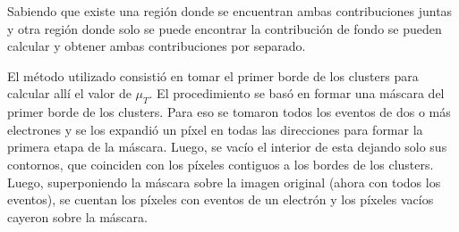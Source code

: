Sabiendo que existe una región donde se encuentran ambas contribuciones juntas y otra región donde solo se puede encontrar la contribución de fondo se pueden calcular y obtener ambas contribuciones por separado.

El método utilizado consistió en tomar el primer borde de los clusters para calcular allí el valor de $\mu_{T}$. El procedimiento se basó en formar una máscara del primer borde de los clusters. Para eso se tomaron todos los eventos de dos o más electrones y se los expandió un píxel en todas las direcciones para formar la primera etapa de la máscara. Luego, se vacío el interior de esta dejando solo sus contornos, que coinciden con los píxeles contiguos a los bordes de los clusters. Luego, superponiendo la máscara sobre la imagen original (ahora con todos los eventos), se cuentan los píxeles con eventos de un electrón y los píxeles vacíos cayeron sobre la máscara. 
